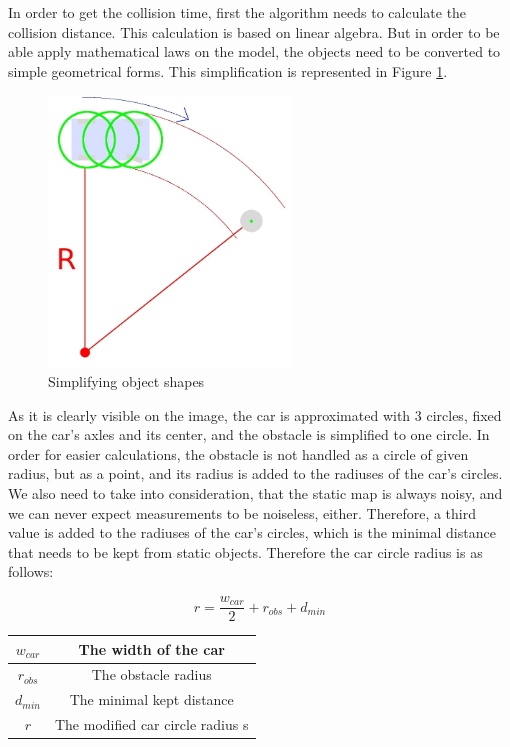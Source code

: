 In order to get the collision time, first the algorithm needs to calculate the collision distance. This calculation is based on linear algebra. But in order to be able apply mathematical laws on the model, the objects need to be converted to simple geometrical forms. This simplification is represented in Figure \ref{static_collision_time_check_object_simplification}.

\begin{figure}[!ht]
    \centering
    \includegraphics[height=72mm]{figures/raw/jpeg/static_collision_time_check_object_simplification.jpg}
    \caption{Simplifying object shapes}
    \label{static_collision_time_check_object_simplification}
\end{figure}

As it is clearly visible on the image, the car is approximated with 3 circles, fixed on the car's axles and its center, and the obstacle is simplified to one circle. In order for easier calculations, the obstacle is not handled as a circle of given radius, but as a point, and its radius is added to the radiuses of the car's circles. We also need to take into consideration, that the static map is always noisy, and we can never expect measurements to be noiseless, either. Therefore, a third value is added to the radiuses of the car's circles, which is the minimal distance that needs to be kept from static objects. Therefore the car circle radius is as follows:

\begin{equation}\label{eq:car_circle_radius}
r = \frac{w_{car}}{2} + r_{obs} + d_{min}
\end{equation}

\begin{center}
    \begin{tabular}{ | c | c | }
        \hline
        $w_{car}$    & The width of the car             \\
        \hline
        $r_{obs}$    & The obstacle radius              \\
        \hline 
        $d_{min}$    & The minimal kept distance        \\
        \hline 
        $r$          & The modified car circle radius   s\\
        \hline
    \end{tabular}
\end{center}

